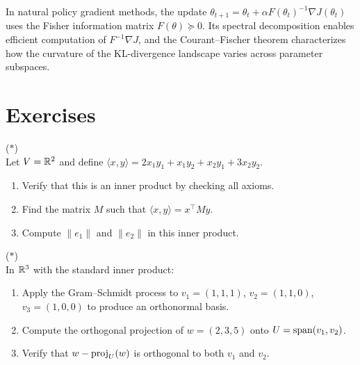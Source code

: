 \documentclass[11pt,a4paper]{article}
\begin{document}
\begin{rlconnection}[title={Natural Policy Gradient and the Fisher Matrix}]
In natural policy gradient methods, the update
$\theta_{t+1} = \theta_t + \alpha F(\theta_t)^{-1} \nabla J(\theta_t)$
uses the Fisher information matrix $F(\theta) \succeq 0$.  Its spectral
decomposition enables efficient computation of $F^{-1}\nabla J$, and
the Courant--Fischer theorem characterizes how the curvature of the
KL-divergence landscape varies across parameter subspaces.
\end{rlconnection}

\section{Exercises}
\label{sec:exercises}

\begin{exercise}
\label{exer:ip_verify}
\textnormal{(\(*\))} \\
Let $V = \mathbb{R}^2$ and define $\langle x, y \rangle = 2x_1 y_1 + x_1 y_2 + x_2 y_1 + 3x_2 y_2$.
\begin{enumerate}[nosep,label=(\alph*)]
  \item Verify that this is an inner product by checking all axioms.
  \item Find the matrix $M$ such that $\langle x, y \rangle = x^\top M y$.
  \item Compute $\|e_1\|$ and $\|e_2\|$ in this inner product.
\end{enumerate}
\end{exercise}

\begin{exercise}
\label{exer:gram_schmidt}
\textnormal{(\(*\))} \\
In $\mathbb{R}^3$ with the standard inner product:
\begin{enumerate}[nosep,label=(\alph*)]
  \item Apply the Gram--Schmidt process to $v_1 = (1, 1, 1)$,
        $v_2 = (1, 1, 0)$, $v_3 = (1, 0, 0)$ to produce an orthonormal
        basis.
  \item Compute the orthogonal projection of $w = (2, 3, 5)$ onto
        $U = \operatorname{span}(v_1, v_2)$.
  \item Verify that $w - \operatorname{proj}_U(w)$ is orthogonal to both $v_1$ and $v_2$.
\end{enumerate}
\end{exercise}
\end{document}
